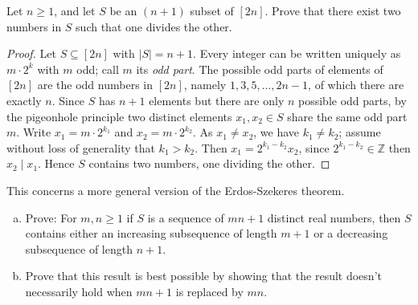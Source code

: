 \documentclass{article}
\begin{document}
\setcounter{problem}{3}
\begin{problem} %
    Let $n \ge 1$, and let $S$ be an $(n+1)$ subset of $[2n]$. Prove that there exist two numbers in $S$ such that one divides the other.
\end{problem}

\begin{proof}
    Let $S \subseteq [2n]$ with $|S| = n+1$. Every integer can be written uniquely as $m \cdot 2^k$ with $m$ odd; call $m$ its \emph{odd part}. The possible odd parts of elements of $[2n]$ are the odd numbers in $[2n]$, namely $1, 3, 5, \dots, 2n-1$, of which there are exactly $n$. Since $S$ has $n+1$ elements but there are only $n$ possible odd parts, by the pigeonhole principle two distinct elements $x_1, x_2 \in S$ share the same odd part $m$. Write $x_1 = m \cdot 2^{k_1}$ and $x_2 = m \cdot 2^{k_2}$. As $x_1 \ne x_2$, we have $k_1 \ne k_2$; assume without loss of generality that $k_1 > k_2$. Then $x_1 = 2^{k_1 - k_2} x_2$, since $2^{k_1 - k_2} \in \mathbb{Z}$ then $x_2 \mid x_1$. Hence $S$ contains two numbers, one dividing the other.
\end{proof}

\setcounter{problem}{7}
\begin{problem} %
    This concerns a more general version of the Erdos-Szekeres theorem.
    \begin{enumerate}[(a)]
        \item Prove: For $m,n \ge 1$ if $S$ is a sequence of $mn+1$ distinct real numbers, then $S$ contains either an increasing subsequence of length $m+1$ or a decreasing subsequence of length $n+1$.
        \item Prove that this result is best possible by showing that the result doesn't necessarily hold when $mn+1$ is replaced by $mn$.
    \end{enumerate}
\end{problem}
\end{document}
